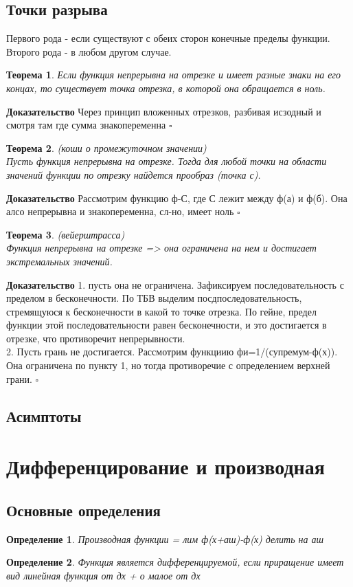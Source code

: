 \documentclass[a4paper]{article}
\newtheorem{defin}{Определение}
\newtheorem{theor}{Теорема}
\begin{document}
\subsection{Точки разрыва}
Первого рода - если существуют с обеих сторон конечные пределы функции.\\
Второго рода - в любом другом случае. 
\begin{theor}
Если функция непрерывна на отрезке и имеет разные знаки на его концах, то 
существует точка отрезка, в которой она обращается в ноль.
\end{theor}
\textbf{Доказательство} Через принцип вложенных отрезков, разбивая исзодный и 
смотря там где сумма знакопеременна $\square$
\begin{theor} (коши о промежуточном значении)\\
Пусть функция непрерывна на отрезке. Тогда для любой точки на области значений
функции по отрезку найдется прообраз (точка с).
\end{theor}
\textbf{Доказательство} Рассмотрим функцию ф-С, где С лежит между ф(а) и ф(б).
Она алсо непрерывна и знакопеременна, сл-но, имеет ноль  $\square$
\begin{theor}
(вейерштрасса)\\
Функция непрерывна на отрезке => она ограничена на нем и достигает 
экстремальных значений. 
\end{theor}
\textbf{Доказательство} 1. пусть она не ограничена. Зафиксируем 
последовательность с пределом в бесконечности. По ТБВ выделим 
посдпоследовательность, стремящуюся к бесконечности в какой то точке отрезка. 
По гейне, предел функции этой последовательности равен бесконечности, и это
достигается в отрезке, что противоречит непрерывности.\\
2. Пусть грань не достигается. Рассмотрим функциию фи=1/(супремум-ф(х)). Она
ограничена по пункту 1, но тогда противоречие с определением верхней грани.
$\square$
\subsection{Асимптоты}



\section{Дифференцирование и производная}
\subsection{Основные определения}
\begin{defin}
Производная функции = лим ф(х+аш)-ф(х) делить на аш
\end{defin}
\begin{defin}
Функция является дифференцируемой, если приращение имеет вид линейная функция
от дх + о малое от дх
\end{defin}
\end{document}
